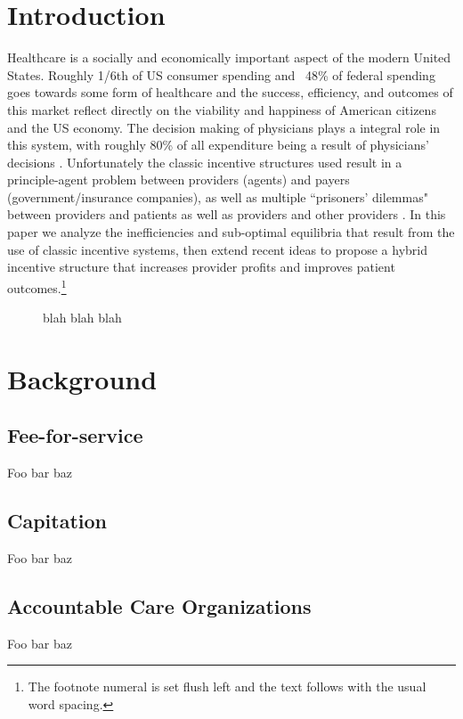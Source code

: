 \documentclass[a4paper]{llncs}
\begin{document}
\section*{Introduction}

Healthcare is a socially and economically important aspect of the modern United States. Roughly 1/6th of US consumer spending and ~48\% of federal \cite{federalspend} spending goes towards some form of healthcare \cite{econharvard} and the success, efficiency, and outcomes of this market reflect directly on the viability and happiness of American citizens and the US economy. The decision making of physicians plays a integral role in this system, with roughly 80\% of all expenditure being a result of physicians' decisions \cite{trust}. Unfortunately the classic incentive structures used result in a principle-agent problem between providers (agents) and payers (government/insurance companies), as well as multiple ``prisoners' dilemmas" between providers and patients as well as providers and other providers \cite{blended}. In this paper we analyze the inefficiencies and sub-optimal equilibria that result from the use of classic incentive systems, then extend recent ideas to propose a hybrid incentive structure that increases provider profits and improves patient outcomes.\footnote{The footnote numeral is set flush left and the text follows with the usual word spacing.}

\begin{figure}
\centering
\caption{blah blah blah}
\label{fig:example}
\end{figure}


\section*{Background}

\subsection*{Fee-for-service}
Foo bar baz

\subsection*{Capitation}
Foo bar baz

\subsection*{Accountable Care Organizations}
Foo bar baz
\end{document}
